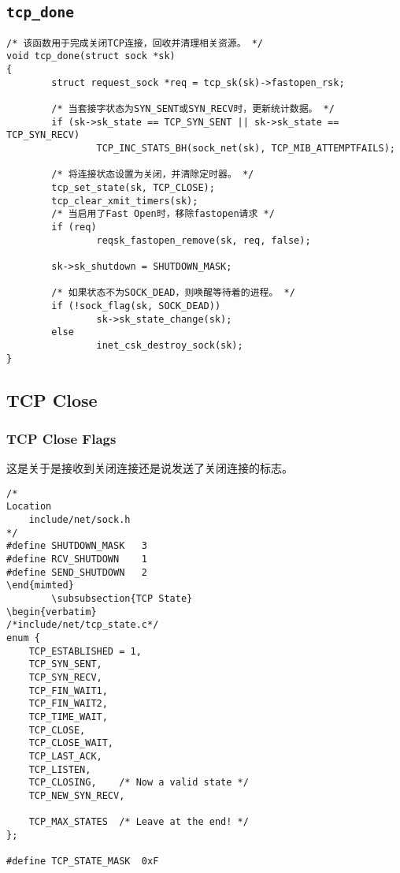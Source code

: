 \subsection{\texttt{tcp_done}}
\begin{verbatim}
/* 该函数用于完成关闭TCP连接，回收并清理相关资源。 */
void tcp_done(struct sock *sk)
{
        struct request_sock *req = tcp_sk(sk)->fastopen_rsk;

        /* 当套接字状态为SYN_SENT或SYN_RECV时，更新统计数据。 */
        if (sk->sk_state == TCP_SYN_SENT || sk->sk_state == TCP_SYN_RECV)
                TCP_INC_STATS_BH(sock_net(sk), TCP_MIB_ATTEMPTFAILS);

        /* 将连接状态设置为关闭，并清除定时器。 */
        tcp_set_state(sk, TCP_CLOSE);
        tcp_clear_xmit_timers(sk);
        /* 当启用了Fast Open时，移除fastopen请求 */
        if (req)
                reqsk_fastopen_remove(sk, req, false);

        sk->sk_shutdown = SHUTDOWN_MASK;

        /* 如果状态不为SOCK_DEAD，则唤醒等待着的进程。 */
        if (!sock_flag(sk, SOCK_DEAD))
                sk->sk_state_change(sk);
        else
                inet_csk_destroy_sock(sk);
}
\end{verbatim}



	\subsection{TCP Close}
		\subsubsection{TCP Close Flags}
			这是关于是接收到关闭连接还是说发送了关闭连接的标志。
\begin{verbatim}
/*
Location
	include/net/sock.h
*/
#define SHUTDOWN_MASK	3
#define RCV_SHUTDOWN	1
#define SEND_SHUTDOWN	2
\end{mimted}
		\subsubsection{TCP State}
\begin{verbatim}
/*include/net/tcp_state.c*/
enum {
	TCP_ESTABLISHED = 1,
	TCP_SYN_SENT,
	TCP_SYN_RECV,
	TCP_FIN_WAIT1,
	TCP_FIN_WAIT2,
	TCP_TIME_WAIT,
	TCP_CLOSE,
	TCP_CLOSE_WAIT,
	TCP_LAST_ACK,
	TCP_LISTEN,
	TCP_CLOSING,	/* Now a valid state */
	TCP_NEW_SYN_RECV,

	TCP_MAX_STATES	/* Leave at the end! */
};

#define TCP_STATE_MASK	0xF
\end{verbatim}


